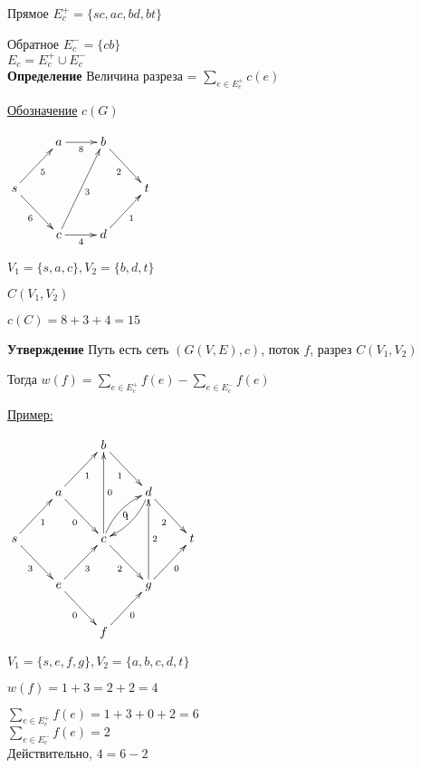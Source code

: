 \documentclass[a4paper, 12pt] {article}
\begin{document}
Прямое $ E_{c}^{+} = \{sc,ac, bd, bt \} $

Обратное $ E_{c}^{-} = \{cb\}$\\

$ E_{c} = E_{c}^{+} \cup E_{c}^{-} $\\

\textbf{Определение} Величина разреза = $ \sum\limits_{e \in E_{c}^{+}} c(e) $

\underline{Обозначение} $ c(G) $

$\begin{matrix}
	\xymatrix{
		& a  \ar@{->}[r]_8 & b \ar@{->}[rd]_2 \\
		s \ar@{->}[rd]_6 \ar@{->}[ru]_5 &  & & t \\
		& c \ar@{->}[r]_4 \ar@{->}[ruu]_3 & d \ar@{->}[ru]_1 \\
	}
\end{matrix}$

$ V_{1} = \{s, a, c\}, V_{2} = \{b, d, t\} $

$ C(V_{1}, V_{2})$ 

 $ c(C)= 8+3+4=15 $

\textbf{Утверждение}
Путь есть сеть $ (G(V, E), c) $, поток $ f $, разрез $ C(V_{1}, V_{2}) $

Тогда $ w(f) = \sum\limits_{e \in E_{c}^{+}} f(e) - \sum\limits_{e \in E_{c}^{-}} f(e)$

\newpage

\underline{Пример:}

$\begin{matrix}
	\xymatrix{
		& & b \ar@{->}[rd]_1 \\
		& a \ar@{->}[rd]_0 \ar@{->}[ru]_1 & & d \ar@{->}[rd]_2 \ar@/^/[dl]_0 \\
		s \ar@{->}[rd]_3 \ar@{->}[ru]_1 & & c \ar@{->}[uu]_0 \ar@{->}[rd]_2 \ar@/^/[ru]_1  & & t \\
		& e \ar@{->}[rd]_0 \ar@{->}[ru]_3 & & g \ar@{->}[ru]_0 \ar@{->}[uu]_2 \\
		& & f \ar@{->}[ru]_0
	}
\end{matrix}$

$ V_{1} = \{s, e, f, g\}, V_{2} = \{a, b, c, d, t\} $

$ w(f) = 1+3 = 2+2=4 $

$ \sum\limits_{e \in E_{c}^{+}} f(e) = 1+3+0+2=6 $\\

$ \sum\limits_{e \in E_{c}^{-}} f(e)=2 $\\

Действительно, $ 4 = 6-2 $
\end{document}
